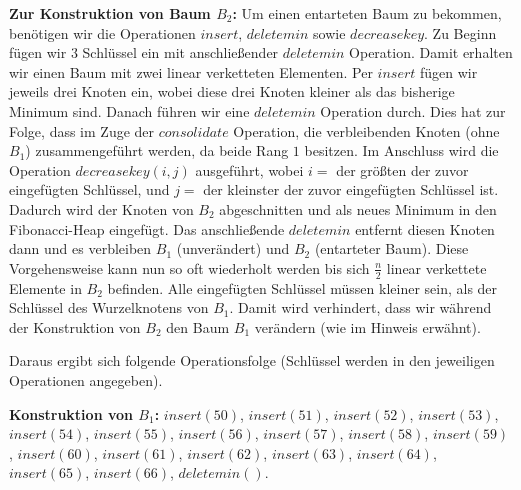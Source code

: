 \documentclass{article}
\begin{document}
\textbf{Zur Konstruktion von Baum $B_2$:} \newline
Um einen entarteten Baum zu bekommen, ben{\"o}tigen wir die Operationen $insert$,
$deletemin$ sowie $decreasekey$. Zu Beginn f{\"u}gen wir $3$ Schl{\"u}ssel ein
mit anschlie{\ss}ender $deletemin$ Operation. Damit erhalten wir einen Baum mit
zwei linear verketteten Elementen. Per $insert$ f{\"u}gen wir jeweils drei Knoten
ein, wobei diese drei Knoten kleiner als das bisherige Minimum sind. Danach
f{\"u}hren wir eine $deletemin$ Operation durch. Dies hat zur Folge, dass im Zuge
der $consolidate$ Operation, die verbleibenden Knoten (ohne $B_1$)
zusammengef{\"u}hrt werden, da beide Rang $1$ besitzen. Im Anschluss wird die
Operation $decreasekey(i, j)$ ausgef{\"u}hrt, wobei $i =$ der gr{\"o}{\ss}ten der
zuvor eingef{\"u}gten Schl{\"u}ssel, und $j = $ der kleinster der zuvor
eingef{\"u}gten Schl{\"u}ssel ist. Dadurch wird der Knoten von $B_2$ abgeschnitten
und als neues Minimum in den Fibonacci-Heap eingef{\"u}gt. Das anschlie{\ss}ende
$deletemin$ entfernt diesen Knoten dann und es verbleiben $B_1$ (unver{\"a}ndert)
und $B_2$ (entarteter Baum). Diese Vorgehensweise kann nun so oft wiederholt
werden bis sich $\frac{n}{2}$ linear verkettete Elemente in $B_2$ befinden. Alle
eingef{\"u}gten Schl{\"u}ssel m{\"u}ssen kleiner sein, als der Schl{\"u}ssel des
Wurzelknotens von $B_1$. Damit wird verhindert, dass wir w{\"a}hrend der
Konstruktion von $B_2$ den Baum $B_1$ ver{\"a}ndern (wie im Hinweis erw{\"a}hnt).

\clearpage

Daraus ergibt sich folgende Operationsfolge (Schl{\"u}ssel werden in den
jeweiligen Operationen angegeben).

\textbf{Konstruktion von $B_1$:} \newline
$insert(50)$, $insert(51)$, $insert(52)$, $insert(53)$, $insert(54)$, \newline
$insert(55)$, $insert(56)$, $insert(57)$, $insert(58)$, $insert(59)$, \newline
$insert(60)$, $insert(61)$, $insert(62)$, $insert(63)$, $insert(64)$, \newline
$insert(65)$, $insert(66)$, $deletemin()$.
\end{document}
